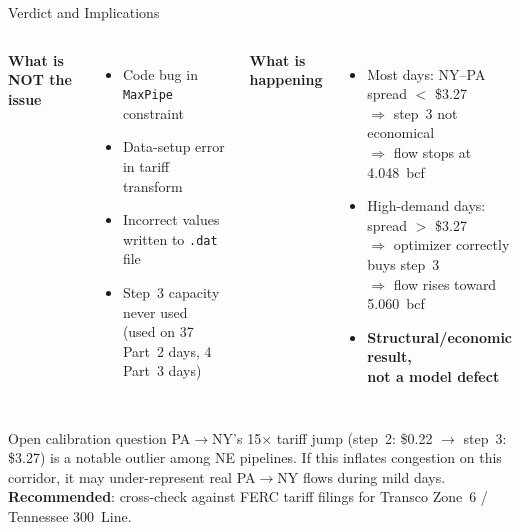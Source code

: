 \documentclass[aspectratio=169, 11pt]{beamer}
\begin{document}
\begin{frame}{Verdict and Implications}
  \begin{columns}[T]
      \textbf{\textcolor{okgreen}{What is NOT the issue}}
      \begin{itemize}
        \item[$\checkmark$] Code bug in \texttt{MaxPipe} constraint
        \item[$\checkmark$] Data-setup error in tariff transform
        \item[$\checkmark$] Incorrect values written to \texttt{.dat} file
        \item[$\checkmark$] Step~3 capacity never used \\
          {\small (used on 37 Part~2 days, 4 Part~3 days)}
      \end{itemize}

      \textbf{\textcolor{noteblue}{What is happening}}
      \begin{itemize}
        \item Most days: NY--PA spread $<$ \$3.27 \\
          $\Rightarrow$ step~3 not economical \\
          $\Rightarrow$ flow stops at 4.048~bcf
        \item High-demand days: spread $>$ \$3.27 \\
          $\Rightarrow$ optimizer correctly buys step~3 \\
          $\Rightarrow$ flow rises toward 5.060~bcf
        \item \textbf{Structural/economic result, \\
          not a model defect}
      \end{itemize}
  \end{columns}

  \vspace{0.8em}
  \begin{block}{Open calibration question}
    PA$\to$NY's 15$\times$ tariff jump (step~2: \$0.22 $\to$ step~3: \$3.27) is a notable outlier among NE pipelines. If this inflates congestion on this corridor, it may under-represent real PA$\to$NY flows during mild days. \textbf{Recommended}: cross-check against FERC tariff filings for Transco Zone~6 / Tennessee 300~Line.
  \end{block}
\end{frame}
\end{document}
